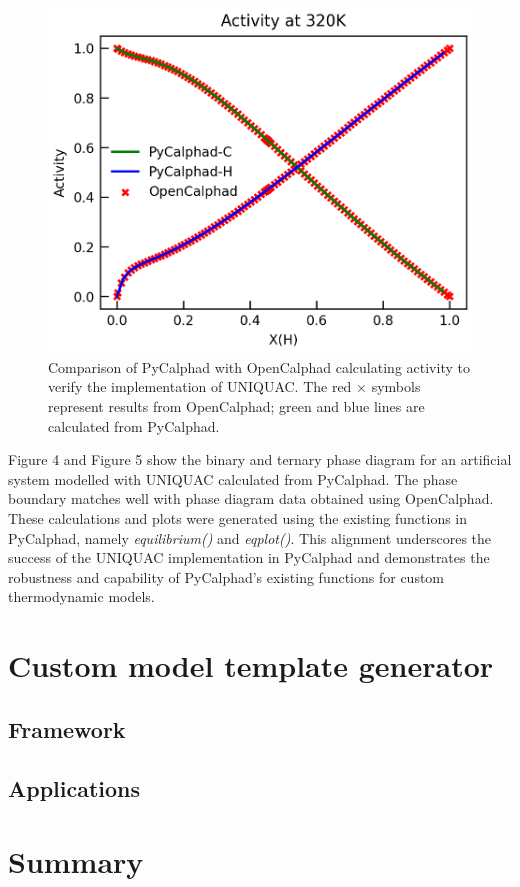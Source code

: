 \begin{figure}[H]
    \centering
    \includegraphics[width=0.5\linewidth]{models/Models-UQC-Activity.png}
    \caption{Comparison of PyCalphad with OpenCalphad calculating activity to verify the implementation of UNIQUAC. The red $\times$ symbols represent results from OpenCalphad; green and blue lines are calculated from PyCalphad.}
    \label{models:fig:UQCacr}
\end{figure}

Figure 4 and Figure 5 show the binary and ternary phase diagram for an artificial system modelled with UNIQUAC calculated from PyCalphad. The phase boundary matches well with phase diagram data obtained using OpenCalphad. These calculations and plots were generated using the existing functions in PyCalphad, namely \textit{equilibrium()} and \textit{eqplot()}. This alignment underscores the success of the UNIQUAC implementation in PyCalphad and demonstrates the robustness and capability of PyCalphad's existing functions for custom thermodynamic models.


\section{Custom model template generator} \label{models:sec:CMTG}


\subsection{Framework} \label{models:ssec:CMTGframework}


\subsection{Applications} \label{models:ssec:CMTGapp}


\section{Summary} \label{models:sec:Summary}
